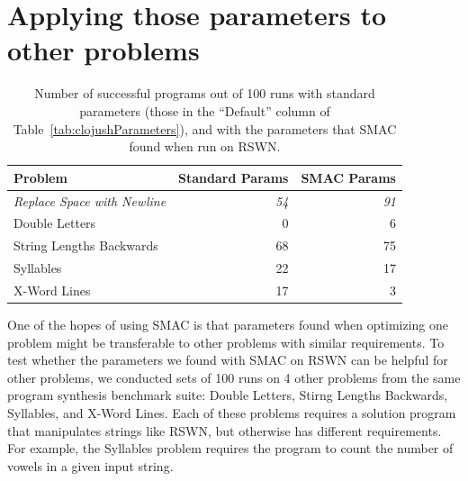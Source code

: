 
\section{Applying those parameters to other problems}
\label{sec:applyingToOtherProblems}

%
%

\begin{table}[t]
\centering
\caption{Number of successful programs out of 100 runs with standard parameters (those in the ``Default'' column of Table~\ref{tab:clojushParameters}), and with the parameters that SMAC found when run on RSWN.}
\label{table:results}
\begin{tabular}{l r r}
\toprule
\textbf{Problem} & \textbf{Standard Params} & \textbf{SMAC Params} \tabularnewline
\midrule
\textit{Replace Space with Newline} & \textit{54} & \textit{91} \tabularnewline
Double Letters	& 0 & 6 \tabularnewline
String Lengths Backwards & 68 & 75 \tabularnewline
Syllables & 22 & 17 \tabularnewline
X-Word Lines & 17 & 3 \tabularnewline
\bottomrule
\end{tabular}
\end{table}

One of the hopes of using SMAC is that parameters found when optimizing one problem might be transferable to other problems with similar requirements. To test whether the parameters we found with SMAC on RSWN can be helpful for other problems, we conducted sets of 100 runs on 4 other problems from the same program synthesis benchmark suite: Double Letters, Stirng Lengths Backwards, Syllables, and X-Word Lines. Each of these problems requires a solution program that manipulates strings like RSWN, but otherwise has different requirements. For example, the Syllables problem requires the program to count the number of vowels in a given input string.

